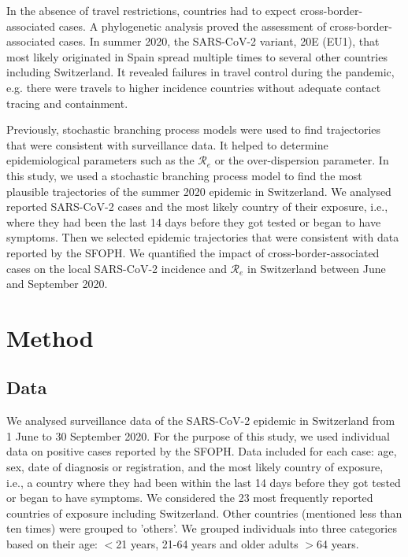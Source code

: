 \documentclass[10pt, a4paper, twoside]{article}
\begin{document}
\begin{multicols}{2}
In the absence of travel restrictions, countries had to expect cross-border-associated cases.\cite{russell_effect_2021} 
A phylogenetic analysis proved the assessment of cross-border-associated cases.\cite{hodcroft_emergence_2020}
In summer 2020, the SARS-CoV-2 variant, 20E (EU1), that most likely originated in Spain spread multiple times to several other countries including Switzerland.\cite{hodcroft_emergence_2020}
It revealed failures in travel control during the pandemic, e.g. there were travels to higher incidence countries without adequate contact tracing and containment.\cite{hodcroft_emergence_2020}

Previously, stochastic branching process models were used to find trajectories that were consistent with surveillance data.\cite{althaus_ebola_2015,riou_pattern_2020}
It helped to determine epidemiological parameters such as the $\mathcal{R}_e$ or the over-dispersion parameter.\cite{althaus_ebola_2015,riou_pattern_2020}
In this study, we used a stochastic branching process model to find the most plausible trajectories of the summer 2020 epidemic in Switzerland.
We analysed reported SARS-CoV-2 cases and the most likely country of their exposure, i.e., where they had been the last 14 days before they got tested or began to have symptoms.
Then we selected epidemic trajectories that were consistent with data reported by the SFOPH.
We quantified the impact of cross-border-associated cases on the local SARS-CoV-2 incidence and $\mathcal{R}_e$ in Switzerland between June and September 2020.

\section{Method}

\subsection{Data}
We analysed surveillance data of the SARS-CoV-2 epidemic in Switzerland from 1 June to 30 September 2020. 
For the purpose of this study, we used individual data on positive cases reported by the SFOPH. 
Data included for each case: age, sex, date of diagnosis or registration, and the most likely country of exposure, i.e., a country where they had been within the last 14 days before they got tested or began to have symptoms.
We considered the 23 most frequently reported countries of exposure including Switzerland.
Other countries (mentioned less than ten times) were grouped to 'others'.
We grouped individuals into three categories based on their age: $<$21 years, 21-64 years and older adults $>$64 years.


\end{multicols}
\end{document}
